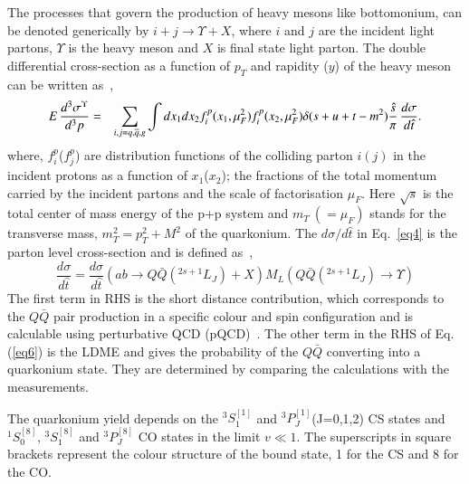 
The processes that govern the production of heavy mesons like bottomonium,
can be denoted generically by 
$i+j\rightarrow \Upsilon +X$, where $i$ and $j$ are the incident light partons,
$\Upsilon$ is the heavy meson and $X$ is final state light parton.
The double differential cross-section as a function of $p_T$ and rapidity ($y$) of 
the heavy meson can be written as~\cite{Kumar:2016ojy},
\begin{eqnarray}
  E\,\frac{d^3\sigma^{\Upsilon} }{d^3p} &=& \sum_{i,j=q,\overline{q},g} \int dx_1 dx_2 f_{i}^p(x_1,\mu_F^2)
  f_{i}^p(x_2,\mu_F^2) \delta(s+u+t-m^2) {\hat{s} \over \pi} \, \frac{d\sigma}{d\hat{t}}.
  \label{eq4}
\end{eqnarray}
where, $f_{i}^p$($f_{j}^p$) are distribution functions of the colliding parton $i(j)$ in
the incident protons as a function of $x_1$($x_2$); the fractions of the total momentum
carried by the incident partons and the scale of factorisation $\mu_F$.
Here $\sqrt{s}$ is the total center of mass energy of the p+p system and $m_T~(=\mu_F)$ stands for
the transverse mass, $m_T^2=p_T^2 + M^2$ of the quarkonium.
The ${d\sigma}/{d\hat{t}}$ in Eq.~\ref{eq4} is the parton level cross-section and is
defined as~\cite{Bodwin:1994jh},
\begin{equation}
  \frac{d\sigma}{d\hat{t}} = \frac{d\sigma}{d\hat{t}}(ab\rightarrow Q\bar{Q}(^{2s+1}L_J)+X)
  M_L(Q\bar{Q}(^{2s+1}L_J)\rightarrow \Upsilon)
  \label{eq6}
\end{equation}
The first term in RHS is the short distance contribution, which corresponds to the $Q\bar{Q}$
pair production in a specific colour and spin configuration and is calculable using 
perturbative QCD (pQCD)~\cite{Braaten:2000cm,Baier:1983va,Humpert:1986cy,Gastmans:1987be,Cho:1995vh,Cho:1995ce}.
The other term in the RHS of Eq.(\ref{eq6}) is the LDME 
and gives the probability of the $Q\bar{Q}$ converting into a quarkonium state.
They are determined by comparing the calculations with the measurements.

The quarkonium yield depends on the $^3S_1^{[1]}$ 
and $^3P_J^{[1]}$(J=0,1,2) CS states and $^1S_0^{[8]}$, $^3S_1^{[8]}$ and $^3P_J^{[8]}$
CO states in the limit $v\ll 1$.
The superscripts in square brackets represent the colour structure of the bound state,
1 for the CS and 8 for the CO.



